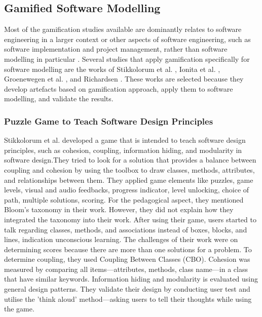 \documentclass[12pt, a4paper]{report}
\begin{document}
\subsection{Gamified Software Modelling}
Most of the gamification studies available are dominantly relates to software engineering in a larger context or other aspects of software engineering, such as software implementation and project management, rather than software modelling in particular \cite{Pedreira2015}. Several studies that apply gamification specifically for software modelling are the works of Stikkolorum et al. \cite{Stikkolorum2014}, Ionita et al. \cite{Ionita2015}, Groenewegen et al. \cite{Groenewegen2010}, and Richardsen \cite{Richardsen2014}. These works are selected because they develop artefacts based on gamification approach, apply them to software modelling, and validate the results.

\subsubsection{Puzzle Game to Teach Software Design Principles}
Stikkolorum et al. \cite{Stikkolorum2014} developed a game that is intended to teach software design principles, such as cohesion, coupling, information hiding, and modularity in software design.They tried to look for a solution that provides a balance between coupling and cohesion by using the toolbox to draw classes, methods, attributes, and relationships between them. They applied game elements like puzzles, game levels, visual and audio feedbacks, progress indicator, level unlocking, choice of path, multiple solutions, scoring. For the pedagogical aspect, they mentioned Bloom’s taxonomy in their work. However, they did not explain how they integrated the taxonomy into their work. After using their game, users started to talk regarding classes, methods, and associations instead of boxes, blocks, and lines, indication unconscious learning. The challenges of their work were on determining scores because there are more than one solutions for a problem. To determine coupling, they used Coupling Between Classes (CBO). Cohesion was measured by comparing all items—attributes, methods, class name—in a class that have similar keywords. Information hiding and modularity is evaluated using general design patterns. They validate their design by conducting user test and utilise the 'think aloud' method—asking users to tell their thoughts while using the game. 
\end{document}
